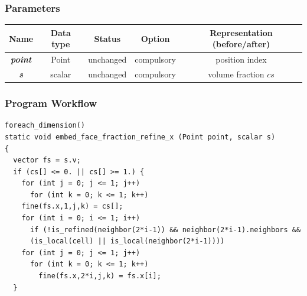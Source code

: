 \documentclass[a4paper]{article}
\newcommand{\para}[1]{\textbf{\emph{\textcolor{para}{#1}}}}
\begin{document}
\subsubsection{Parameters}
\hfill
\begin{table}[h]
  \centering
  \begin{tabular}{|c|c|c|c|c|}
    \hline
    Name & Data type & Status & Option & Representation (before/after)\\[0.5ex]
    \hline\hline
    \para{point} & Point & unchanged & compulsory & position index\\
    \hline
    \para{s} & scalar & unchanged & compulsory & volume fraction $cs$\\
    \hline
  \end{tabular}
\end{table}

\subsubsection{Program Workflow}
\begin{multicols}{2}
 \columnbreak
 \begin{verbatim}
foreach_dimension()
static void embed_face_fraction_refine_x (Point point, scalar s)
{
  vector fs = s.v;
  if (cs[] <= 0. || cs[] >= 1.) {
    for (int j = 0; j <= 1; j++)
      for (int k = 0; k <= 1; k++)
	fine(fs.x,1,j,k) = cs[];
    for (int i = 0; i <= 1; i++)
      if (!is_refined(neighbor(2*i-1)) && neighbor(2*i-1).neighbors &&
	  (is_local(cell) || is_local(neighbor(2*i-1))))
	for (int j = 0; j <= 1; j++)
	  for (int k = 0; k <= 1; k++)
	    fine(fs.x,2*i,j,k) = fs.x[i];
  }
 \end{verbatim}
\end{multicols}

\begin{center}
\end{center}
\end{document}
